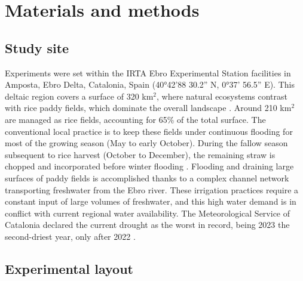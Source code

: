 \section{Materials and methods}
\label{sec:meth}

\subsection{Study site}
\label{sec:meth_Site}

Experiments were set within the IRTA Ebro Experimental Station facilities in Amposta, Ebro Delta, Catalonia, Spain (40°42’88 30.2” N, 0°37’ 56.5” E). This deltaic region covers a surface of 320 km$^2$, where natural ecosystems contrast with rice paddy fields, which dominate the overall landscape \citep{romagosa2013sustainability}. Around 210 km$^2$ are managed as rice fields, accounting for 65\% of the total surface. The conventional local practice is to keep these fields under continuous flooding for most of the growing season (May to early October). During the fallow season subsequent to rice harvest (October to December), the remaining straw is chopped and incorporated before winter flooding \citep{martinez-eixarch2021a}. Flooding and draining large surfaces of paddy fields is accomplished thanks to a complex channel network transporting freshwater from the Ebro river. These irrigation practices require a constant input of large volumes of freshwater, and this high water demand is in conflict with current regional water availability. The Meteorological Service of Catalonia declared the current drought as the worst in record, being 2023 the second-driest year, only after 2022 \citep{MeteoCat2024}. 

\subsection{Experimental layout}
\label{sec:meth_Exp}

